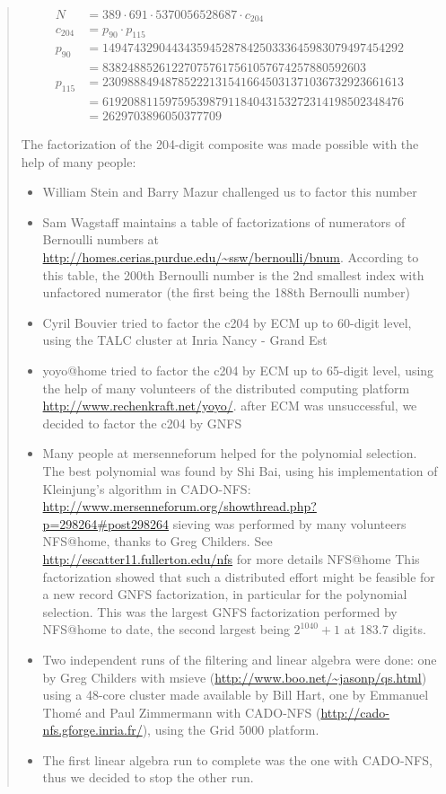 \documentclass[openany]{book}
\theoremstyle{plain}
\theoremstyle{definition}
\begin{document}
{\begin{quote}
\begin{align*}
N &= 389 \cdot 691 \cdot 5370056528687 \cdot c_{204}\\
c_{204} &= p_{90} \cdot p_{115}\\
p_{90}  &= 149474329044343594528784250333645983079497454292\\
        &= 838248852612270757617561057674257880592603\\
p_{115} &= 230988849487852221315416645031371036732923661613\\
        &= 619208811597595398791184043153272314198502348476\\
        &= 2629703896050377709
\end{align*}

The factorization of the 204-digit composite was made possible with the help
of many people:
\begin{itemize}
\item William Stein and Barry Mazur challenged us to factor this number
\item Sam Wagstaff maintains a table of factorizations of numerators of Bernoulli
  numbers at \url{http://homes.cerias.purdue.edu/~ssw/bernoulli/bnum}. According
  to this table, the 200th Bernoulli number is the 2nd smallest index with
  unfactored numerator (the first being the 188th Bernoulli number)
\item Cyril Bouvier tried to factor the c204 by ECM up to 60-digit level, using
  the TALC cluster at Inria Nancy - Grand Est
\item {\sf yoyo@home} tried to factor the c204 by ECM up to 65-digit level, using the
  help of many volunteers of the distributed computing platform
  \url{http://www.rechenkraft.net/yoyo/}.
 after ECM was unsuccessful, we decided to factor the c204 by GNFS
\item Many people at mersenneforum helped for the polynomial selection. The best
  polynomial was found by Shi Bai, using his implementation of Kleinjung's
  algorithm in CADO-NFS:
  \url{http://www.mersenneforum.org/showthread.php?p=298264#post298264}
 sieving was performed by many volunteers {\sf NFS@home}, thanks to Greg
  Childers. See \url{http://escatter11.fullerton.edu/nfs} for more details {\sf NFS@home}
  This factorization showed that such a distributed effort might be feasible for a
  new record GNFS factorization, in particular for the polynomial selection.
  This was the largest GNFS factorization performed by {\sf NFS@home} to date,
  the second largest being $2^{1040}+1$ at 183.7 digits.
\item Two independent runs of the filtering and linear algebra were done: one by Greg
  Childers with msieve (\url{http://www.boo.net/~jasonp/qs.html}) using a 48-core
  cluster made available by Bill Hart, one by Emmanuel Thomé and Paul
  Zimmermann with CADO-NFS (\url{http://cado-nfs.gforge.inria.fr/}), using the Grid
  5000 platform.
\item The first linear algebra run to complete was the one with CADO-NFS, thus we
  decided to stop the other run.
\end{itemize}


\end{quote}}
\end{document}
